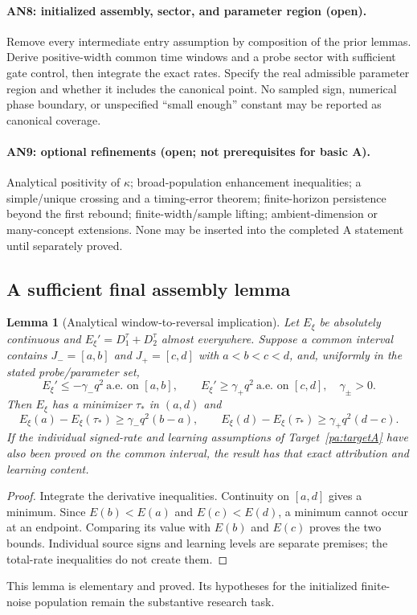 \documentclass[11pt]{article}
\numberwithin{equation}{section}
\newtheorem{lemma}[proposition]{Lemma}
\theoremstyle{definition}
\theoremstyle{remark}
\newcommand{\1}{\mathbf 1}
\begin{document}
\paragraph{AN8: initialized assembly, sector, and parameter region (open).}
Remove every intermediate entry assumption by composition of the prior
lemmas. Derive positive-width common time windows and a probe sector with
sufficient gate control, then integrate the exact rates. Specify the real
admissible parameter region and whether it includes the canonical point.
No sampled sign, numerical phase boundary, or unspecified ``small enough''
constant may be reported as canonical coverage.

\paragraph{AN9: optional refinements (open; not prerequisites for basic A).}
Analytical positivity of $\kappa$; broad-population enhancement inequalities;
a simple/unique crossing and a timing-error theorem; finite-horizon
persistence beyond the first rebound; finite-width/sample lifting;
ambient-dimension or many-concept extensions. None may be inserted into
the completed A statement until separately proved.

\subsection{A sufficient final assembly lemma}
\begin{lemma}[Analytical window-to-reversal implication]\label{pa:assembly}
Let $E_\xi$ be absolutely continuous and $E_\xi'=D_1^\tau+D_2^\tau$ almost
everywhere. Suppose a common interval contains
$J_-=[a,b]$ and $J_+=[c,d]$ with $a<b<c<d$, and, uniformly in the stated
probe/parameter set,
\[
 E_\xi'\le-\gamma_-q^2\ \text{a.e. on }[a,b],\qquad
 E_\xi'\ge\gamma_+q^2\ \text{a.e. on }[c,d],
 \quad\gamma_\pm>0.
\]
Then $E_\xi$ has a minimizer $\tau_*$ in $(a,d)$ and
\[
 E_\xi(a)-E_\xi(\tau_*)\ge\gamma_-q^2(b-a),\qquad
 E_\xi(d)-E_\xi(\tau_*)\ge\gamma_+q^2(d-c).
\]
If the individual signed-rate and learning assumptions of
Target~\ref{pa:targetA} have also been proved on the common interval, the
result has that exact attribution and learning content.
\end{lemma}
\begin{proof}
Integrate the derivative inequalities. Continuity on $[a,d]$ gives a
minimum. Since $E(b)<E(a)$ and $E(c)<E(d)$, a minimum cannot occur at
an endpoint. Comparing its value with $E(b)$ and $E(c)$ proves the two
bounds. Individual source signs and learning levels are separate premises;
the total-rate inequalities do not create them.
\end{proof}
This lemma is elementary and proved. Its hypotheses for the initialized
finite-noise population remain the substantive research task.
\end{document}
